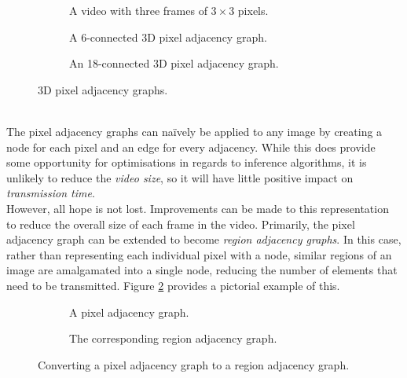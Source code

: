 \begin{figure}[h!]
    \centering
    \begin{subfigure}[b]{0.29\textwidth}
        \centering
        \captionsetup{justification=centering}
        \scalebox{1}{}
        \caption{A video with three frames of $3 \times 3$ pixels.}
    \end{subfigure} \hfill%
    \begin{subfigure}[b]{0.29\textwidth}
        \centering
        \captionsetup{justification=centering}
        \scalebox{0.5}{}
        \caption{A 6-connected 3D pixel adjacency graph.}
    \end{subfigure} \hfill%
    \begin{subfigure}[b]{0.29\textwidth}
        \centering
        \captionsetup{justification=centering}
        \scalebox{0.5}{}
        \caption{An 18-connected 3D pixel adjacency graph.}
    \end{subfigure}%
    \caption[3D Pixel Adjacency Graphs]{3D pixel adjacency graphs.}
    \label{fig:3dAdjacency}
\end{figure}
\smallskip \\ \indent
The pixel adjacency graphs can na\"ively be applied to any image by creating a node for each pixel and an edge for every adjacency. While this does provide some opportunity for optimisations in regards to inference algorithms, it is unlikely to reduce the \textit{video size}, so it will have little positive impact on \textit{transmission time}.
\smallskip \\ \indent
However, all hope is not lost. Improvements can be made to this representation to reduce the overall size of each frame in the video. Primarily, the pixel adjacency graph can be extended to become \textit{region adjacency graphs}. In this case, rather than representing each individual pixel with a node, similar regions of an image are amalgamated into a single node, reducing the number of elements that need to be transmitted. Figure \ref{fig:pixelToRegion} provides a pictorial example of this.
\begin{figure}[htp]
    \centering
    \begin{subfigure}[b]{0.45\textwidth}
        \centering
        \captionsetup{justification=centering}
        \scalebox{0.5}{}
        \caption{A pixel adjacency graph.}
    \end{subfigure}
    \begin{subfigure}[b]{0.45\textwidth}
        \centering
        \captionsetup{justification=centering}
        \scalebox{0.5}{}
        \caption{The corresponding region adjacency graph.}
    \end{subfigure}
    \caption[Pixel to Region Conversion]{Converting a pixel adjacency graph to a region adjacency graph.}
    \label{fig:pixelToRegion}
\end{figure}
